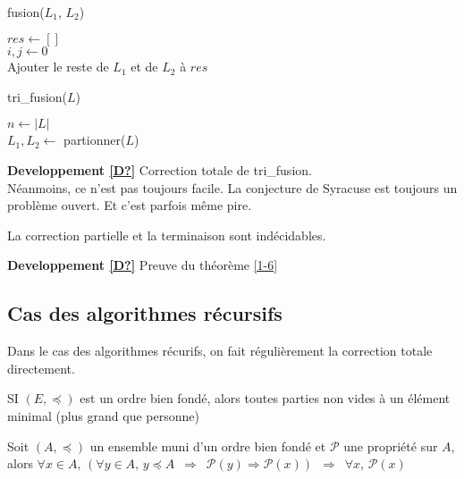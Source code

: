 \begin{example}\enspace\\
	\begin{algorithm}[H]
		\caption{fusion($L_1$, $L_2$)}
		$res \gets []$\\
		$i,j \gets 0$\\
		Ajouter le reste de $L_1$ et de $L_2$ à $res$\\
	\end{algorithm}

	\begin{algorithm}[H]
		\caption{tri\_fusion($L$)}
		$n \gets |L|$\\
		$L_1, L_2 \gets$ partionner($L$)\\
	\end{algorithm}
\end{example}

\textbf{Developpement \ref{D?}} Correction totale de tri\_fusion.\\

Néanmoins, ce n'est pas toujours facile. La conjecture de Syracuse est toujours un problème ouvert. Et c'est parfois même pire.

\begin{theorem}
	La correction partielle et la terminaison sont indécidables. \label{1-6}
\end{theorem}

\textbf{Developpement \ref{D?}} Preuve du théorème \ref{1-6}

\subsection{Cas des algorithmes récursifs}

Dans le cas des algorithmes récurifs, on fait régulièrement la correction totale directement.

\begin{proposition}
	SI $(E, \preceq)$ est un ordre bien fondé, alors toutes parties non vides à un élément minimal (plus grand que personne)
\end{proposition}

\begin{theorem}
	\label{1-4}
	Soit $(A, \preceq)$ un ensemble muni d'un ordre bien fondé et $\mathcal P$ une propriété sur $A$, alors $\forall x \in A, \, (\forall y \in A, \, y \preceq A \enspace \Rightarrow \enspace \mathcal P(y) \Rightarrow \mathcal P(x)) \enspace \Rightarrow \enspace \forall x ,\, \mathcal P(x)$
\end{theorem}

